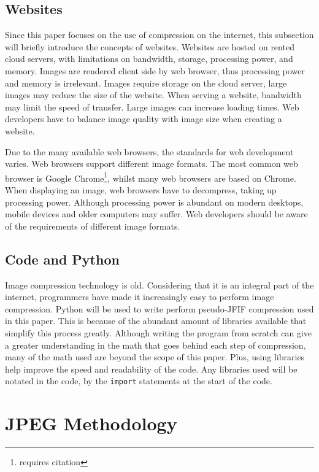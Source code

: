 \documentclass{article}
\begin{document}
\subsection{Websites}
Since this paper focuses on the use of compression on the internet, this subsection will briefly introduce the concepts of websites.
Websites are hosted on rented cloud servers, with limitations on bandwidth, storage, processing power, and memory.
Images are rendered client side by web browser, thus processing power and memory is irrelevant.
Images require storage on the cloud server, large images may reduce the size of the website.
When serving a website, bandwidth may limit the speed of transfer.
Large images can increase loading times.
Web developers have to balance image quality with image size when creating a website.

Due to the many available web browsers, the standards for web development varies.
Web browsers support different image formats.
The most common web browser is Google Chrome\footnote{requires citation}, whilst many web browsers are based on Chrome.
When displaying an image, web browsers have to decompress, taking up processing power.
Although processing power is abundant on modern desktops, mobile devices and older computers may suffer.
Web developers should be aware of the requirements of different image formats.

\subsection{Code and Python}
Image compression technology is old.
Considering that it is an integral part of the internet, programmers have made it increasingly easy to perform image compression.
Python will be used to write perform pseudo-JFIF compression used in this paper.
This is because of the abundant amount of libraries available that simplify this process greatly.
Although writing the program from scratch can give a greater understanding in the math that goes behind each step of compression, many of the math used are beyond the scope of this paper.
Plus, using libraries help improve the speed and readability of the code.
Any libraries used will be notated in the code, by the \texttt{import} statements at the start of the code.

\section{JPEG Methodology}

\end{document}
